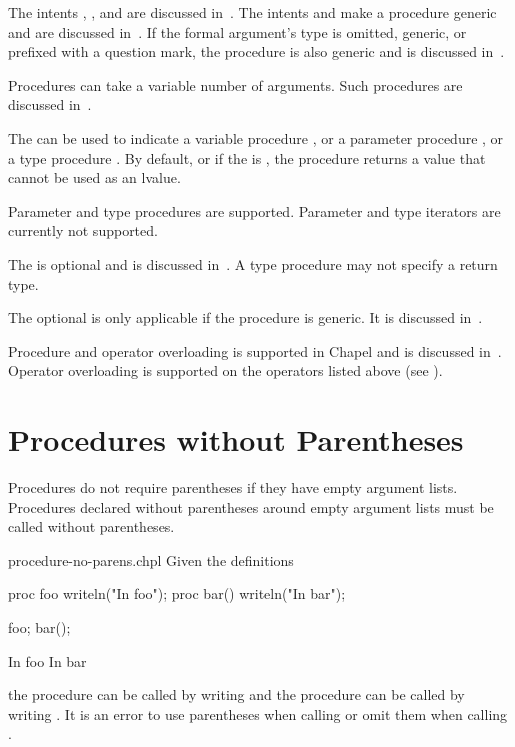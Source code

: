 The intents , , and  are discussed
in~.  The intents  and  make
a procedure generic and are discussed in~.  If the
formal argument's type is omitted, generic, or prefixed with a question
mark, the procedure is also generic and is discussed
in~.

Procedures can take a variable number of arguments.  Such procedures are
discussed in~.

The  can be used to indicate
a variable procedure ,
or a parameter procedure ,
or a type procedure .
By default, or if the  is ,
the procedure returns a value that cannot be used as an lvalue.

\begin{openissue}
Parameter and type procedures are supported. Parameter and type
iterators are currently not supported.
\end{openissue}

The  is optional and is discussed in~.
A type procedure may not specify a return type.

The optional  is only applicable if the procedure is
generic.  It is discussed in~.

Procedure and operator overloading is supported in Chapel and is
discussed in~.
Operator overloading is supported on the operators listed
above (see ).


\section{Procedures without Parentheses}
\label{Procedures_without_Parentheses}

Procedures do not require parentheses if they have empty argument
lists.  Procedures declared without parentheses around empty argument
lists must be called without parentheses.

\begin{chapelexample}{procedure-no-parens.chpl}
Given the definitions
\begin{chapel}
proc foo { writeln("In foo"); }
proc bar() { writeln("In bar"); }
\end{chapel}
\begin{chapelpost}
foo;
bar();
\end{chapelpost}
\begin{chapeloutput}
In foo
In bar
\end{chapeloutput}
the procedure  can be called by writing  and the
procedure  can be called by writing .  It is an
error to use parentheses when calling  or omit them
when calling .
\end{chapelexample}



